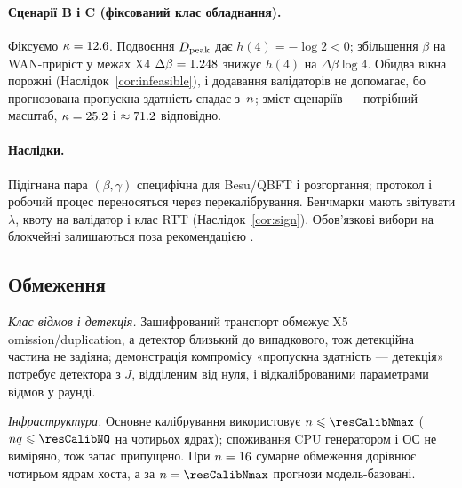 \paragraph{Сценарії B і C (фіксований клас обладнання).}
Фіксуємо $\kappa=12.6$. Подвоєння $D_{\mathrm{peak}}$ дає $h(4)=-\log2<0$;
збільшення $\beta$ на WAN-приріст у межах X4 $\Delta\beta=1.248$
знижує $h(4)$ на $\Delta\beta\log4$. Обидва вікна порожні
(Наслідок~\ref{cor:infeasible}), і додавання валідаторів не допомагає, бо
прогнозована пропускна здатність спадає з~$n$; зміст сценаріїв --- потрібний
масштаб, $\kappa=25.2$ і $\approx71.2$ відповідно.

\paragraph{Наслідки.}
Підігнана пара $(\beta,\gamma)$ специфічна для Besu/QBFT і розгортання; протокол
\RNM{} і робочий процес переносяться через перекалібрування. Бенчмарки мають
звітувати $\lambda$, квоту на валідатор і клас RTT (Наслідок~\ref{cor:sign}).
Обов'язкові вибори на блокчейні залишаються поза рекомендацією
\cite{springall2014,specter2020,park2021}.

\subsection{Обмеження}
\label{sec:limitations}

\emph{Клас відмов і детекція.} Зашифрований транспорт обмежує X5
omission/duplication, а детектор близький до випадкового, тож детекційна
частина не задіяна; демонстрація компромісу «пропускна здатність --- детекція»
потребує детектора з $J$, відділеним від нуля, і відкаліброваними параметрами
відмов у раунді.

\emph{Інфраструктура.} Основне калібрування використовує $\n\le\resCalibNmax$
($\n\q\le\resCalibNQ$ на чотирьох ядрах); споживання CPU генератором і ОС не
виміряно, тож запас припущено. При $n=16$ сумарне обмеження
дорівнює чотирьом ядрам хоста, а за $\n=\resCalibNmax$ прогнози модель-базовані.
